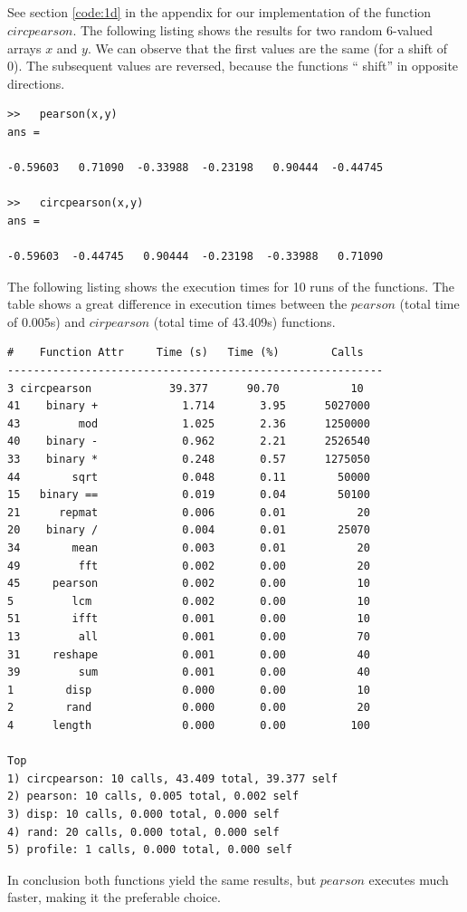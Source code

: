 \documentclass{article}
\begin{document}
\subsection{}
See section \ref{code:1d} in the appendix for our implementation of the function $circpearson$. The following listing shows the results for two random 6-valued arrays $x$ and $y$. We can observe that the first values are the same (for a shift of 0). The subsequent values are reversed, because the functions `` shift'' in opposite directions.
\begin{lstlisting}[title=Results]
>>   pearson(x,y)
ans =

-0.59603   0.71090  -0.33988  -0.23198   0.90444  -0.44745

>>   circpearson(x,y)
ans =

-0.59603  -0.44745   0.90444  -0.23198  -0.33988   0.71090
\end{lstlisting}
The following listing shows the execution times for 10 runs of the functions. The table shows a great difference in execution times between the $pearson$ (total time of 0.005s) and $cirpearson$ (total time of 43.409s) functions.
\begin{lstlisting}[title=Speed]
#    Function Attr     Time (s)   Time (%)        Calls
----------------------------------------------------------
3 circpearson            39.377      90.70           10
41    binary +             1.714       3.95      5027000
43         mod             1.025       2.36      1250000
40    binary -             0.962       2.21      2526540
33    binary *             0.248       0.57      1275050
44        sqrt             0.048       0.11        50000
15   binary ==             0.019       0.04        50100
21      repmat             0.006       0.01           20
20    binary /             0.004       0.01        25070
34        mean             0.003       0.01           20
49         fft             0.002       0.00           20
45     pearson             0.002       0.00           10
5         lcm              0.002       0.00           10
51        ifft             0.001       0.00           10
13         all             0.001       0.00           70
31     reshape             0.001       0.00           40
39         sum             0.001       0.00           40
1        disp              0.000       0.00           10
2        rand              0.000       0.00           20
4      length              0.000       0.00          100

Top
1) circpearson: 10 calls, 43.409 total, 39.377 self
2) pearson: 10 calls, 0.005 total, 0.002 self
3) disp: 10 calls, 0.000 total, 0.000 self
4) rand: 20 calls, 0.000 total, 0.000 self
5) profile: 1 calls, 0.000 total, 0.000 self
\end{lstlisting}
In conclusion both functions yield the same results, but $pearson$ executes much faster, making it the preferable choice.
\end{document}
